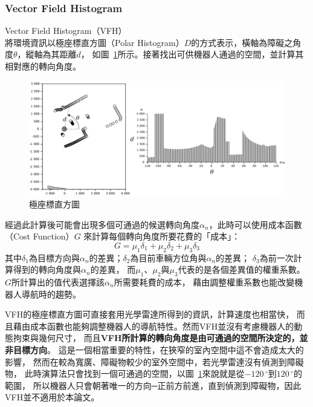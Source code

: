 \subsubsection{Vector Field Histogram}
Vector Field Histogram（VFH）~\cite{Borenstein:1991:VFH}
將環境資訊以極座標直方圖（Polar Histogram）$D$的方式表示，橫軸為障礙之角度$\theta$，縱軸為其距離$d$，
如圖~\ref{f:vfh}所示。接著找出可供機器人通過的空間，並計算其相對應的轉向角度。
\begin{figure}[h!]
	\centering
	\includegraphics[width=\textwidth]{figures/VFHTotal.png}
	\caption{極座標直方圖}
	\label{f:vfh}
\end{figure}

經過此計算後可能會出現多個可通過的候選轉向角度$\alpha_n$，此時可以使用成本函數（Cost Function）$G$
來計算每個轉向角度所要花費的「成本」：
\begin{equation}
	G = \mu_1 \delta_1 + \mu_2 \delta_2 + \mu_3 \delta_3
\end{equation}
其中$\delta_1$為目標方向與$\alpha_n$的差異；$\delta_2$為目前車輛方位角與$\alpha_n$的差異；
$\delta_3$為前一次計算得到的轉向角度與$\alpha_n$的差異，
而$\mu_1$、$\mu_2$與$\mu_3$代表的是各個差異值的權重系數。
$G$所計算出的值代表選擇該$\alpha_n$所需要耗費的成本，
藉由調整權重系數也能改變機器人導航時的趨勢。

VFH的極座標直方圖可直接套用光學雷達所得到的資訊，計算速度也相當快，
而且藉由成本函數也能夠調整機器人的導航特性。然而VFH並沒有考慮機器人的動態拘束與幾何尺寸，
而且\textbf{VFH所計算的轉向角度是由可通過的空間所決定的，並非目標方向}。
這是一個相當重要的特性，在狹窄的室內空間中這不會造成太大的影響，
然而在較為寬廣、障礙物較少的室外空間中，若光學雷達沒有偵測到障礙物，
此時演算法只會找到一個可通過的空間，以圖~\ref{f:vfh}來說就是從$-120\,^{\circ}$到$120\,^{\circ}$的範圍，
所以機器人只會朝著唯一的方向─正前方前進，直到偵測到障礙物，因此VFH並不適用於本論文。

